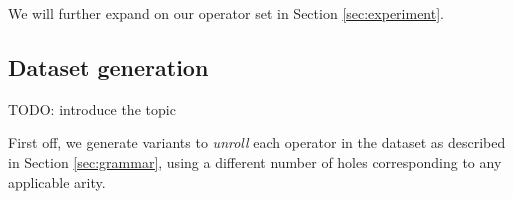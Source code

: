 \documentclass{article}
\begin{document}

We will further expand on our operator set
in Section \ref{sec:experiment}.

\subsection{Dataset generation} \label{sec:datagen}

TODO: introduce the topic



First off, we generate variants to \emph{unroll} each operator in the dataset
as described in Section \ref{sec:grammar},
using a different number of holes corresponding to any applicable arity.
\end{document}
